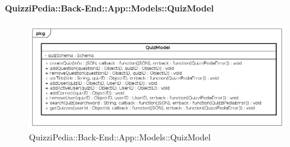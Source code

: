 \paragraph{QuizziPedia::Back-End::App::Models::QuizModel}
\label{QuizziPedia::Back-End::App::Models::QuizModel}
\begin{figure}
	\centering
	\includegraphics[scale=0.45]{UML/Classi/Back-End/QuizziPedia_Back-End_App_Models_quizModel.png}
	\caption{QuizziPedia::Back-End::App::Models::QuizModel}
\end{figure}




